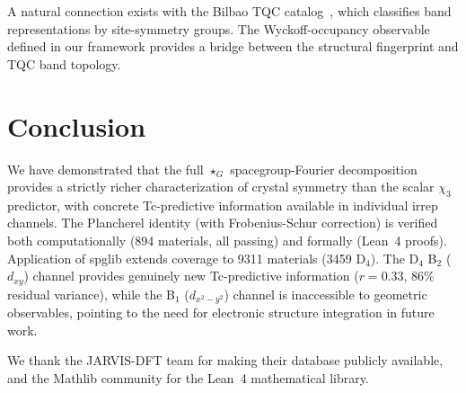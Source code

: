 \documentclass[aps,prb,twocolumn,superscriptaddress]{revtex4-2}
\newcommand{\starG}{\star_G}
\begin{document}
A natural connection exists with the Bilbao TQC
catalog~\cite{bradlyn2017tqc}, which classifies band representations
by site-symmetry groups. The Wyckoff-occupancy observable defined in
our framework provides a bridge between the structural fingerprint
and TQC band topology.

\section{Conclusion}
\label{sec:conclusion}

We have demonstrated that the full $\starG$ spacegroup-Fourier
decomposition provides a strictly richer characterization of crystal
symmetry than the scalar $\chi_3$ predictor, with concrete
Tc-predictive information available in individual irrep channels.
The Plancherel identity (with Frobenius-Schur correction) is verified
both computationally (894 materials, all passing) and formally
(Lean~4 proofs). Application of spglib extends coverage to 9311
materials (3459 D$_4$). The D$_4$ B$_2$ ($d_{xy}$) channel provides
genuinely new Tc-predictive information ($r = 0.33$, 86\% residual
variance), while the B$_1$ ($d_{x^2-y^2}$) channel is inaccessible
to geometric observables, pointing to the need for electronic
structure integration in future work.

\begin{acknowledgments}
We thank the JARVIS-DFT team for making their database publicly
available, and the Mathlib community for the Lean~4 mathematical
library.
\end{acknowledgments}


\end{document}
